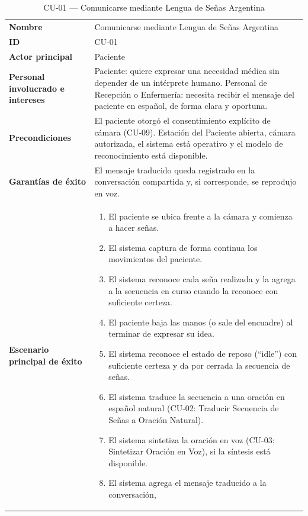 \begin{longtable}{@{}>{\raggedright\arraybackslash}p{4.1cm} >{\raggedright\arraybackslash}p{\dimexpr\textwidth-4.1cm-2\tabcolsep\relax}@{}}
\caption{CU-01 --- Comunicarse mediante Lengua de Señas Argentina}\\
\toprule
\textbf{Nombre} & Comunicarse mediante Lengua de Señas Argentina \\
\textbf{ID} & CU-01 \\
\textbf{Actor principal} & Paciente \\
\textbf{Personal involucrado e intereses} &
Paciente: quiere expresar una necesidad médica sin depender de un
intérprete humano. \newline
Personal de Recepción o Enfermería: necesita recibir el mensaje del
paciente en español, de forma clara y oportuna. \\
\textbf{Precondiciones} &
El paciente otorgó el consentimiento explícito de cámara (CU-09).
Estación del Paciente abierta, cámara autorizada, el sistema está
operativo y el modelo de reconocimiento está disponible. \\
\textbf{Garantías de éxito} &
El mensaje traducido queda registrado en la conversación compartida y, si
corresponde, se reprodujo en voz. \\
\textbf{Escenario principal de éxito} &
\begin{enumerate}[leftmargin=*, itemsep=2pt]
    \item El paciente se ubica frente a la cámara y comienza a hacer señas.
    \item El sistema captura de forma continua los movimientos del paciente.
    \item El sistema reconoce cada seña realizada y la agrega a la
    secuencia en curso cuando la reconoce con suficiente certeza.
    \item El paciente baja las manos (o sale del encuadre) al terminar de
    expresar su idea.
    \item El sistema reconoce el estado de reposo (``idle'') con suficiente
    certeza y da por cerrada la secuencia de señas.
    \item El sistema traduce la secuencia a una oración en español natural
    (CU-02: Traducir Secuencia de Señas a Oración Natural).
    \item El sistema sintetiza la oración en voz (CU-03: Sintetizar
    Oración en Voz), si la síntesis está disponible.
    \item El sistema agrega el mensaje traducido a la conversación,

\end{enumerate}
\end{longtable}
